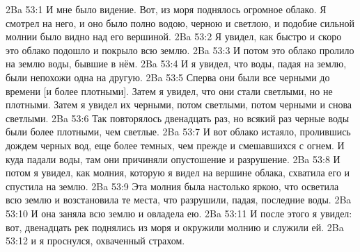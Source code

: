 \vs 2Ba 53:1
И мне было видение. Вот, из моря поднялось огромное облако. Я смотрел на него, и оно было полно водою, черною и светлою, и подобие сильной молнии было видно над его вершиной.
\vs 2Ba 53:2
Я увидел, как быстро и скоро это облако подошло и покрыло всю землю.
\vs 2Ba 53:3
И потом это облако пролило на землю воды, бывшие в нём.
\vs 2Ba 53:4
И я увидел, что воды, падая на землю, были непохожи одна на другую.
\vs 2Ba 53:5
Сперва они были все черными до времени [и более плотными]. Затем я увидел, что они стали светлыми, но не плотными. Затем я увидел их черными, потом светлыми, потом черными и снова светлыми.
\vs 2Ba 53:6
Так повторялось двенадцать раз, но всякий раз черные воды были более плотными, чем светлые.
\vs 2Ba 53:7
И вот облако истаяло, пролившись дождем черных вод, еще более темных, чем прежде и смешавшихся с огнем. И куда падали воды, там они причиняли опустошение и разрушение.
\vs 2Ba 53:8
И потом я увидел, как молния, которую я видел на вершине облака, схватила его и спустила на землю.
\vs 2Ba 53:9
Эта молния была настолько яркою, что осветила всю землю и возстановила те места, что разрушили, падая, последние воды.
\vs 2Ba 53:10
И она заняла всю землю и овладела ею.
\vs 2Ba 53:11
И после этого я увидел: вот, двенадцать рек поднялись из моря и окружили молнию и служили ей.
\vs 2Ba 53:12
и я проснулся, охваченный страхом.

